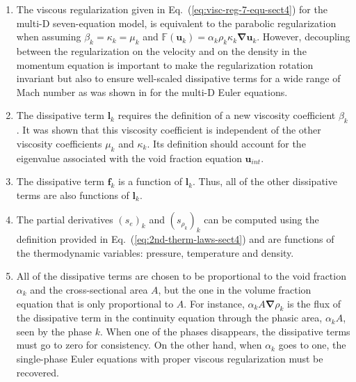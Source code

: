 \documentclass[preprint,10pt]{elsarticle}
\newcommand{\grad}{\mbold{\nabla}}
\newcommand{\mbold}[1]{\boldsymbol#1}
\newcommand{\eqt}[1]{Eq.~(\ref{#1})}                     %
\newcommand{\tcr}[1]{\textcolor{red}{#1}}
\begin{document}
\begin{enumerate}
\item {The viscous regularization given in \eqt{eq:visc-reg-7-equ-sect4} for the multi-D seven-equation model, is equivalent to the parabolic regularization \cite{Parabolic} when assuming $\beta_k = \kappa_k = \mu_k$ and $\mathbb{F}(\mbold u_k) = \alpha_k \rho_k \kappa_k \grad \mbold u_k$. However, decoupling between the regularization on the velocity and on the density in the momentum equation is important to make the regularization rotation invariant but also to ensure well-scaled dissipative terms for a wide range of Mach number as was shown in \cite{Marco_paper_low_mach} for the multi-D Euler equations.}
\item {The dissipative term $\mbold l_k$ requires the definition of a new viscosity
    coefficient $\beta_k$. It was shown that this viscosity coefficient is independent of
    the other viscosity coefficients $\mu_k$ and $\kappa_k$. Its definition should
    account for the eigenvalue associated with the void fraction equation $\mbold u_{int}$.}

\item {The dissipative term $\mbold f_k$ is a function of $\mbold l_k$. Thus, all of the other
    dissipative terms are also functions of $\mbold l_k$.}

\item {The partial derivatives $(s_e)_k$ and $(s_{\rho_k})_k$ can be computed using the
    definition provided in \eqt{eq:2nd-therm-laws-sect4} and are functions of the thermodynamic
    variables: pressure, temperature and density.}

\item {All of the dissipative terms are chosen to be proportional to the void
    fraction $\alpha_k$ and the cross-sectional area $A$, but the one in the volume fraction equation that is only proportional to $A$. For instance, $\alpha_k A \grad \rho_k$ is the
    flux of the dissipative term in the continuity equation through the phasic area, $\alpha_k A$, seen
    by the phase $k$. When one of the phases disappears, the dissipative terms
    must go to zero for consistency. On the other hand, when $\alpha_k$ goes to one,
    the single-phase Euler equations with proper viscous regularization must be recovered. }    
    

\end{enumerate}
\end{document}

